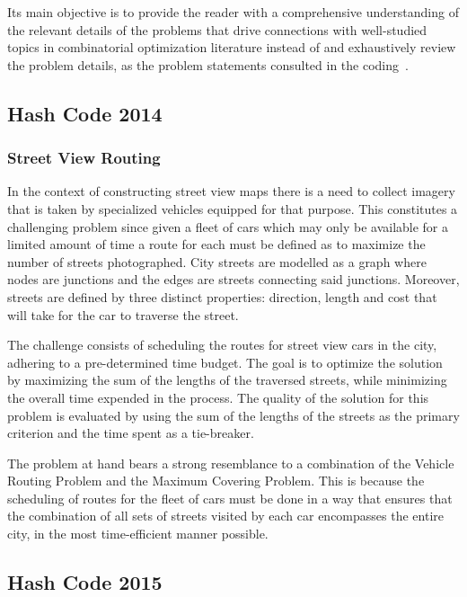 Its main objective is to provide the reader with a comprehensive understanding
of the relevant details of the problems that drive connections with well-studied
topics in combinatorial optimization literature instead of and exhaustively
review the problem details, as the problem statements consulted in the
coding~\cite{googlellc2023codingcompetitionsarchive}.

\subsection{Hash Code 2014}
\label{subsec:hashcode-2014}

\subsubsection*{Street View Routing}
\label{subsubsec:hashcode-2014-final}

In the context of constructing street view maps there is a need to collect
imagery that is taken by specialized vehicles equipped for that purpose. This
constitutes a challenging problem since given a fleet of cars which may only be
available for a limited amount of time a route for each must be defined as to
maximize the number of streets photographed. City streets are modelled as a
graph where nodes are junctions and the edges are streets connecting said
junctions. Moreover, streets are defined by three distinct properties:
direction, length and cost that will take for the car to traverse the street.

The challenge consists of scheduling the routes for street view cars in the
city, adhering to a pre-determined time budget. The goal is to optimize the
solution by maximizing the sum of the lengths of the traversed streets, while
minimizing the overall time expended in the process. The quality of the solution
for this problem is evaluated by using the sum of the lengths of the streets as
the primary criterion and the time spent as a tie-breaker.

The problem at hand bears a strong resemblance to a combination of the Vehicle
Routing Problem and the Maximum Covering Problem. This is because the scheduling
of routes for the fleet of cars must be done in a way that ensures that the
combination of all sets of streets visited by each car encompasses the entire
city, in the most time-efficient manner possible.

\subsection{Hash Code 2015}
\label{subsec:hashcode-2015}

